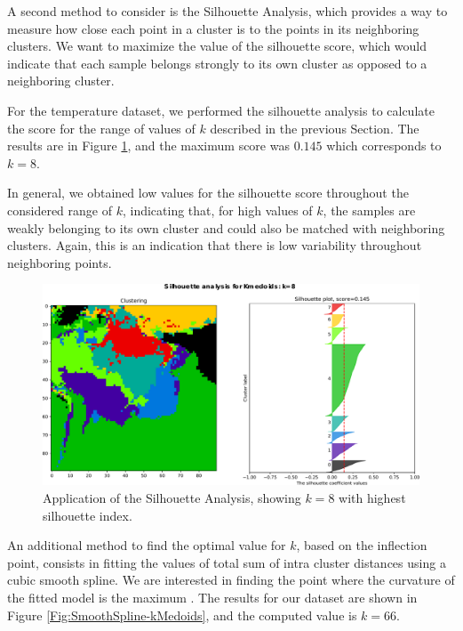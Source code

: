 A second method to consider is the Silhouette Analysis, which provides a way to measure how close each point in a cluster is to the points in its neighboring clusters. We want to maximize the value of the silhouette score, which would indicate that each sample belongs strongly to its own cluster as opposed to a neighboring cluster.

For the temperature dataset, we performed the silhouette analysis to calculate the score for the range of values of $k$ described in the previous Section. The results are in Figure \ref{Fig:Silhouette-kMedoids}, and the maximum score was $0.145$ which corresponds to $k = 8$. 

In general, we obtained low values for the silhouette score throughout the considered range of $k$, indicating that, for high values of $k$, the samples are weakly belonging to its own cluster and could also be matched with neighboring clusters. Again, this is an indication that there is low variability throughout neighboring points.

\begin{figure}[h]
	\centering
	\includegraphics[scale=0.50]{../Figures/silhouette-kmedoids_k8_seed0_lite}
	\caption{Application of the Silhouette Analysis, showing $k=8$ with highest silhouette index.}
	\label{Fig:Silhouette-kMedoids}
\end{figure}

An additional method to find the optimal value for $k$, based on the inflection point, consists in fitting the values of total sum of intra cluster distances using a cubic smooth spline. We are interested in finding the point where the curvature of the fitted model is the maximum \cite{Akima1970}. The results for our dataset are shown in Figure \ref{Fig:SmoothSpline-kMedoids}, and the computed value is $k = 66$.

